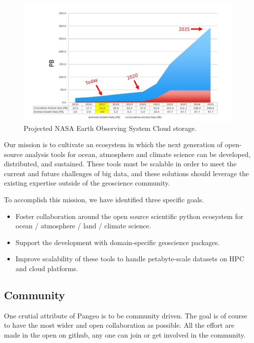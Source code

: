 \documentclass{article}
\begin{document}
\begin{figure}
  \centering
  \includegraphics[width=\columnwidth]{EOSDIS_archive_growth_updated_resize.jpg}
  \caption{\label{nasa_cloud_growth} Projected NASA Earth Observing System Cloud storage\cite{b2}.}
\end{figure}

Our mission is to cultivate an ecosystem in which the next generation of open-source analysis tools for ocean, atmosphere and climate science can be developed, distributed, and sustained. These tools must be scalable in order to meet the current and future challenges of big data, and these solutions should leverage the existing expertise outside of the geoscience community.

To accomplish this mission, we have identified three specific goals.
\begin{itemize}
\item Foster collaboration around the open source scientific python ecosystem for ocean / atmosphere / land / climate science.
\item Support the development with domain-specific geoscience packages.
\item Improve scalability of these tools to handle petabyte-scale datasets on HPC and cloud platforms.
\end{itemize}

\subsection{Community}
\label{ssec:community}

One crutial attribute of Pangeo is to be community driven. The goal is of course to have the most wider and open collaboration as possible. All the effort are made in the open on github\cite{b3}, any one can join or get involved in the community. 
\end{document}

